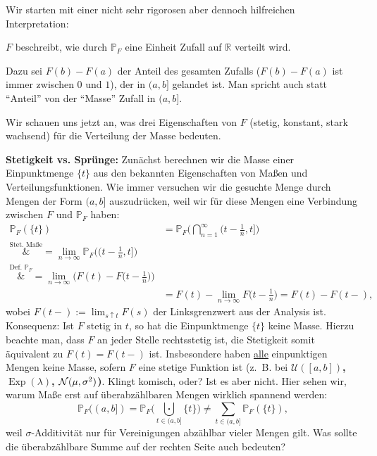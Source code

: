 \begin{disc}\label{diskussion}
Wir starten mit einer nicht sehr rigorosen aber dennoch hilfreichen Interpretation:
\begin{center} \glqq$F$ beschreibt, wie durch $\mathbb P_F$ eine Einheit Zufall auf $\mathbb{R}$ verteilt wird.\grqq \end{center}
Dazu sei $F(b) - F(a)$ der Anteil des gesamten Zufalls ($F(b)-F(a)$ ist immer zwischen $0$ und $1$), der in $(a,b]$ gelandet ist. Man spricht auch statt \enquote{Anteil} von der \enquote{Masse} Zufall in $(a,b]$.\smallskip

Wir schauen uns jetzt an, was drei Eigenschaften von $F$ (stetig, konstant, stark wachsend) f\"ur die Verteilung der Masse bedeuten.\smallskip

\textbf{Stetigkeit vs. Spr\"unge:} Zun\"achst berechnen wir die Masse einer Einpunktmenge $\{t\}$ aus den bekannten Eigenschaften von Ma\ss en und Verteilungsfunktionen. Wie immer versuchen wir die gesuchte Menge durch Mengen der Form $(a,b]$ auszudr\"ucken, weil wir f\"ur diese Mengen eine Verbindung zwischen $F$ und $\mathbb P_F$ haben:
	 \begin{align*}
			\mathbb{P}_F(\{ t \}) &= 
			\mathbb{P}_F \Big(\bigcap\limits_{n = 1}^{\infty} \Big(t - \frac{1}{n}, t\Big] \Big) \\
			\overset{\text{Stet. Ma\ss e}}&{=} \lim\limits_{n \to \infty} \mathbb{P}_F\Big(\Big(t - \frac{1}{n}, t\Big]\Big) \\
			\overset{\text{Def. }\mathbb P_F}&{=} \lim\limits_{n \to \infty} \Big(F(t) - F\Big(t - \frac{1}{n}\Big)\Big)\\
			&= F(t) - \lim\limits_{n \to \infty} F\Big(t - \frac{1}{n}\Big) = F(t) - F(t-),
		\end{align*}
		wobei $F(t-):=\lim_{s\uparrow t} F(s)$ der Linksgrenzwert aus der Analysis ist. Konsequenz: Ist $F$ stetig in $t$, so hat die Einpunktmenge $\{t\}$ keine Masse. Hierzu beachte man, dass $F$ an jeder Stelle rechtsstetig ist, die Stetigkeit somit \"aquivalent zu $F(t)=F(t-)$ ist.
		Insbesondere haben \underline{alle} einpunktigen Mengen keine Masse, sofern $F$ eine stetige Funktion ist (\mbox{z. B.} bei \textbf{$\mathcal U([a,b])$, $\operatorname{Exp}(\lambda)$, $\mathcal{N}(\mu, \sigma^2)$)}. Klingt komisch, oder? Ist es aber nicht. Hier sehen wir, warum Ma\ss e erst auf \"uberabz\"ahlbaren Mengen wirklich spannend werden: \[ \mathbb{P}_F((a,b]) = \mathbb{P}_F \Big( \bigcupdot\limits_{t \in (a,b]} \{t\} \Big) \neq \sum\limits_{t \in (a,b]} \mathbb{P}_F(\{t\}),\] weil $\sigma$-Additivität nur f\"ur Vereinigungen abz\"ahlbar vieler Mengen gilt. Was sollte die \"uberabz\"ahlbare Summe auf der rechten Seite auch bedeuten?\smallskip
		

\end{disc}
